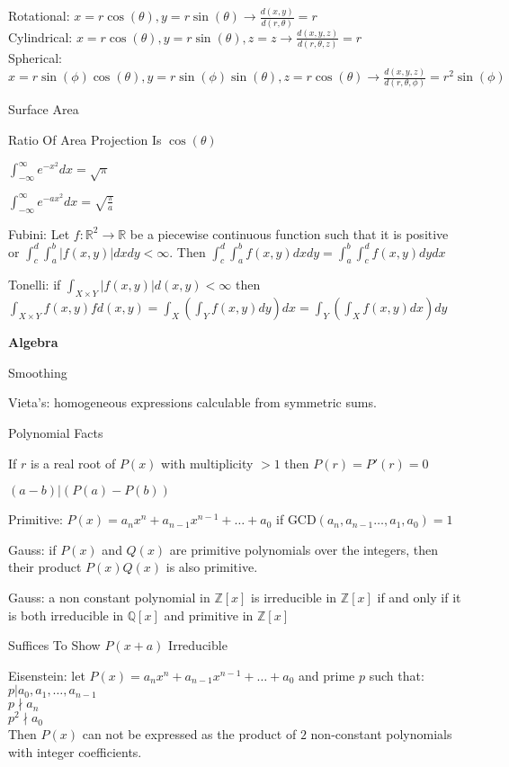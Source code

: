 Rotational: $x=r\cos(\theta), y=r\sin(\theta) \to \frac{d(x,y)}{d(r,\theta)}=r$ \\
Cylindrical: $x=r\cos(\theta),y=r\sin(\theta),z=z \to \frac{d(x,y,z)}{d(r,\theta,z)}=r$ \\
Spherical: $x=r\sin(\phi)\cos(\theta),y=r\sin(\phi)\sin(\theta),z=r\cos(\theta) \to \frac{d(x,y,z)}{d(r,\theta,\phi)}=r^2\sin(\phi)$

Surface Area

Ratio Of Area Projection Is $\cos(\theta)$

$\int_{-\infty}^{\infty} e^{-x^2} dx = \sqrt{\pi}$

$\int_{-\infty}^{\infty} e^{-ax^2} dx = \sqrt{\frac{\pi}{a}}$

Fubini: Let $f: \mathbb{R}^2 \to \mathbb{R}$ be a piecewise continuous function such that it is positive or $\int_c^d \int_a^b |f(x,y)| dx dy < \infty$. Then $\int_c^d \int_a^b f(x,y) dx dy = \int_a^b \int_c^d f(x,y) dy dx$

Tonelli: if $\int_{X \times Y} |f(x,y)| d(x,y) < \infty$ then \\
$\int_{X \times Y} f(x,y)f d(x,y) = \int_{X}\left(\int_{Y} f(x,y) dy \right) dx = \int_{Y}\left(\int_{X} f(x,y) dx \right) dy$

\newpage

\textbf{Algebra}

Smoothing

Vieta's: homogeneous expressions calculable from symmetric sums.

Polynomial Facts

If $r$ is a real root of $P(x)$ with multiplicity $>1$ then $P(r)=P'(r)=0$

$(a-b)|(P(a)-P(b))$

Primitive: $P(x)=a_n x^n+a_{n-1}x^{n-1}+\dots +a_0$ if $\text{GCD}(a_n,a_{n-1}\dots,a_1,a_0)=1$

Gauss: if $P(x)$ and $Q(x)$ are primitive polynomials over the integers, then their product $P(x)Q(x)$ is also primitive.

Gauss: a non constant polynomial in $\mathbb{Z}[x]$ is irreducible in $\mathbb{Z}[x]$ if and only if it is both irreducible in $\mathbb{Q}[x]$ and primitive in $\mathbb{Z}[x]$

Suffices To Show $P(x+a)$ Irreducible

Eisenstein: let $P(x)=a_n x^n+a_{n-1}x^{n-1}+\dots +a_0$ and prime $p$ such that: \\
$p | a_0,a_1,\dots,a_{n-1}$ \\
$p \nmid a_n$ \\
$p^2 \nmid a_0$ \\
Then $P(x)$ can not be expressed as the product of $2$ non-constant polynomials with integer coefficients.

